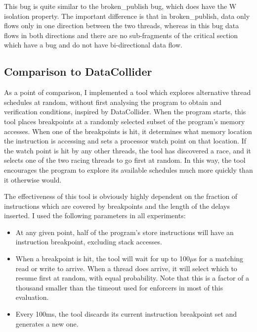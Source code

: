 This bug is quite similar to the broken\_publish bug, which does have
the W isolation property.  The important difference is that in
broken\_publish, data only flows only in one direction between the two
threads, whereas in this bug data flows in both directions and there
are no sub-fragments of the critical section which have a bug and do
not have bi-directional data flow.

\subsection{Comparison to DataCollider}
\label{sect:eval:datacollider}

As a point of comparison, I implemented a tool which explores
alternative thread schedules at random, without first analysing the
program to obtain {\StateMachines} and verification conditions,
inspired by DataCollider\needCite{}.  When the program starts, this
tool places breakpoints at a randomly selected subset of the program's
memory accesses.  When one of the breakpoints is hit, it determines
what memory location the instruction is accessing and sets a processor
watch point\needCite{} on that location.  If the watch point is hit by
any other threads, the tool has discovered a race, and it selects one
of the two racing threads to go first at random.  In this way, the
tool encourages the program to explore its available schedules much
more quickly than it otherwise would.

The effectiveness of this tool is obviously highly dependent on the
fraction of instructions which are covered by breakpoints and the
length of the delays inserted.  I used the following parameters in all
experiments:

\begin{itemize}
\item
  At any given point, half of the program's store instructions will
  have an instruction breakpoint, excluding stack accesses.
\item
  When a breakpoint is hit, the tool will wait for up to 100$\mu$s for
  a matching read or write to arrive.  When a thread does arrive, it
  will select which to resume first at random, with equal probability.
  Note that this is a factor of a thousand smaller than the timeout
  used for {\technique} enforcers in most of this evaluation.
\item
  Every 100ms, the tool discards its current instruction breakpoint
  set and generates a new one.
\end{itemize}

